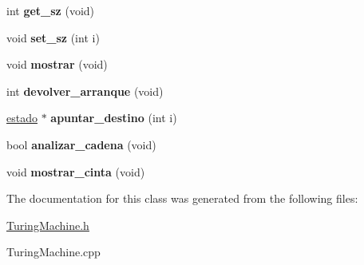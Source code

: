 \begin{DoxyCompactItemize}
int {\bfseries get\+\_\+sz} (void)
\item 
\hypertarget{classTuringMachine_aff23d18c81f7710851af7a268da1393f}{}\label{classTuringMachine_aff23d18c81f7710851af7a268da1393f} 
void {\bfseries set\+\_\+sz} (int i)
\item 
\hypertarget{classTuringMachine_a510612ca74bcc1d33630d5a58463de39}{}\label{classTuringMachine_a510612ca74bcc1d33630d5a58463de39} 
void {\bfseries mostrar} (void)
\item 
\hypertarget{classTuringMachine_a9b320673c56af72a13170e2c97a17ddf}{}\label{classTuringMachine_a9b320673c56af72a13170e2c97a17ddf} 
int {\bfseries devolver\+\_\+arranque} (void)
\item 
\hypertarget{classTuringMachine_afe2dc6df9d281c1fcb2fd7708053d4f4}{}\label{classTuringMachine_afe2dc6df9d281c1fcb2fd7708053d4f4} 
\hyperlink{classestado}{estado} $\ast$ {\bfseries apuntar\+\_\+destino} (int i)
\item 
\hypertarget{classTuringMachine_acce437968d9a3f53a0abe848e2218d6e}{}\label{classTuringMachine_acce437968d9a3f53a0abe848e2218d6e} 
bool {\bfseries analizar\+\_\+cadena} (void)
\item 
\hypertarget{classTuringMachine_ac144ca65c518d3b3743aaa9e54baf842}{}\label{classTuringMachine_ac144ca65c518d3b3743aaa9e54baf842} 
void {\bfseries mostrar\+\_\+cinta} (void)
\end{DoxyCompactItemize}


The documentation for this class was generated from the following files\+:\begin{DoxyCompactItemize}
\item 
\hyperlink{TuringMachine_8h}{Turing\+Machine.\+h}\item 
Turing\+Machine.\+cpp\end{DoxyCompactItemize}
